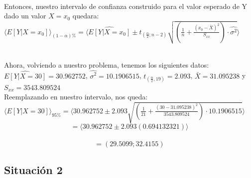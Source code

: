 \documentclass[letterpaper,12pt,onecolumn,titlepage]{article}
\begin{document}
~\\ Entonces, nuestro intervalo de confianza construido para el valor esperado de Y dado un valor $X=x_{0}$ quedara:
~\\ $\langle E[Y|X=x_{0}] \rangle _{(1-\alpha)\%}=\langle \hat{E[Y|X=x_{0}]}\pm t_{(\frac{\alpha}{2};n-2)}\sqrt{(\frac{1}{n}+\frac{(x_{0}-\bar{X})^2}{S_{xx}})\cdot \hat{\sigma^2}} \rangle$

~\\ Ahora, volviendo a nuestro problema, tenemos los siguientes datos: $\hat{E[Y|X=30]}=30.962752$, $\hat{\sigma^2}=10.1906515$, $t_{(\frac{\alpha}{2},19)}=2.093$, $\bar{X}=31.095238$ y $S_{xx}=3543.809524$
~\\ Reemplazando en nuestro intervalo, nos queda: 
~\\ $\langle E[Y|X=30] \rangle _{95\%}=\langle 30.962752 \pm 2.093\sqrt{(\frac{1}{21}+\frac{(30-31.095238)^2}{3543.809524})\cdot 10.1906515} \rangle$
~\\ $$=\langle 30.962752 \pm 2.093(0.694132321)\rangle$$
~\\ $$=(29.5099 ; 32.4155)$$
\pagebreak\subsection{Situaci\'{o}n 2}
\end{document}
